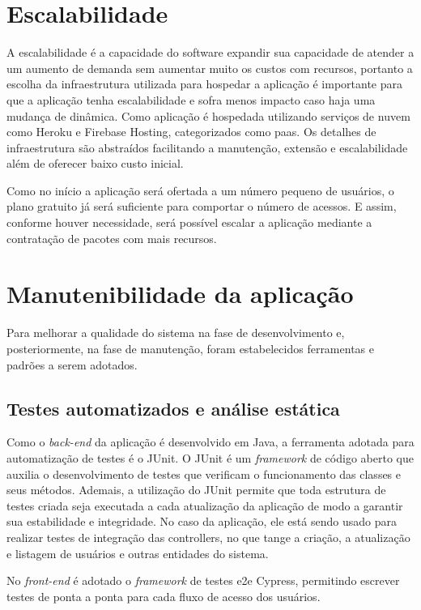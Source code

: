 \section{Escalabilidade}
A escalabilidade é a capacidade do software expandir sua capacidade de atender a um aumento de demanda sem aumentar muito os custos com recursos, portanto a escolha da infraestrutura utilizada para hospedar a aplicação é importante para que a aplicação tenha escalabilidade e sofra menos impacto caso haja uma mudança de dinâmica. Como aplicação é hospedada utilizando serviços de nuvem como Heroku e Firebase Hosting, categorizados como \ac{paas}. Os detalhes de infraestrutura são abstraídos facilitando a manutenção, extensão e escalabilidade além de oferecer baixo custo inicial. 

Como no início a aplicação será ofertada a um número pequeno de usuários, o plano gratuito já será suficiente para comportar o número de acessos. E assim, conforme houver necessidade, será possível escalar a aplicação mediante a contratação de pacotes com mais recursos.

\section{Manutenibilidade da aplicação}
Para melhorar a qualidade do sistema na fase de desenvolvimento e, posteriormente, na fase de manutenção, foram estabelecidos ferramentas e padrões a serem adotados.

\subsection{Testes automatizados e análise estática}


Como o \textit{\gls{back-end}} da aplicação é desenvolvido em Java, a ferramenta adotada para automatização de testes é o JUnit. O JUnit é um \textit{\gls{framework}} de código aberto que auxilia o desenvolvimento de testes que verificam o funcionamento das classes e seus métodos. Ademais, a utilização do JUnit permite que toda estrutura de testes criada seja executada a cada atualização da aplicação  de modo a garantir sua estabilidade e integridade. No caso da aplicação, ele está sendo usado para realizar testes de integração das controllers, no que tange a criação, a atualização e listagem de usuários e outras entidades do sistema.

No \textit{\gls{front-end}} é adotado o \textit{\gls{framework}} de testes \ac{e2e} Cypress, permitindo escrever testes de ponta a ponta para cada fluxo de acesso dos usuários.

